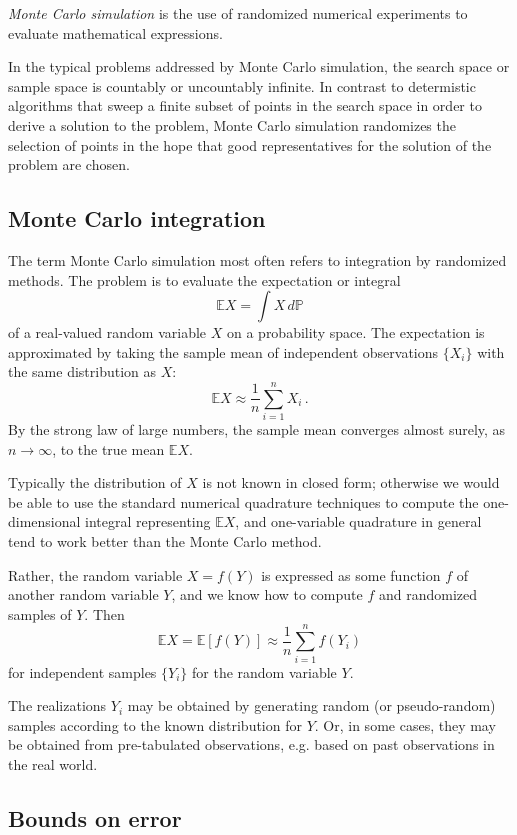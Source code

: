 \documentclass[12pt]{article}
\newcommand{\PP}{\mathbb{P}}
\newcommand{\E}{\mathbb{E}}
\begin{document}
\emph{Monte Carlo simulation}
is the use of randomized numerical experiments
to evaluate mathematical expressions.

In the typical problems addressed by Monte Carlo simulation,
the search space or sample space is countably or uncountably infinite.
In contrast to determistic algorithms that sweep a finite subset of points
in the search space in order to derive a solution
to the problem, Monte Carlo simulation randomizes the selection
of points in the hope that good representatives for the solution
of the problem are chosen.

\subsection*{Monte Carlo integration}

The term Monte Carlo simulation most often
refers to integration by randomized methods.
The problem is to evaluate the expectation or integral
\[
\E X = \int X \, d\PP
\]
of a real-valued 
random variable $X$ on a probability space.
The expectation is approximated by taking the sample mean
of independent observations $\{ X_i \}$ with the same distribution
as $X$:
\[
\E X \approx \frac{1}{n} \sum_{i=1}^n X_i\,.
\]
By the strong law of large numbers, the sample mean
converges almost surely, as $n \to \infty$, to the true mean $\E X$.

Typically the distribution of $X$ is not known in closed form;
otherwise we would be able to use the standard numerical quadrature
techniques to compute the one-dimensional integral representing $\E X$,
and one-variable quadrature 
in general tend to work better than the Monte Carlo method.

Rather, the random variable $X = f(Y)$ is expressed as some function $f$ 
of another random variable $Y$, and we know how to compute $f$
and randomized samples of $Y$.
Then 
\[
\E X = \E[ f(Y) ] \approx \frac1n \sum_{i=1}^n f(Y_i)
\]
for independent samples $\{ Y_i \}$
for the random variable $Y$.

The realizations $Y_i$ 
may be obtained by generating random (or pseudo-random)
samples according to the known distribution for $Y$.
Or, in some cases, they may be obtained from pre-tabulated
observations, e.g. based on past observations in the real world.

\subsection*{Bounds on error}
\end{document}

